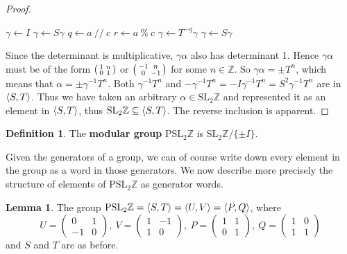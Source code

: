 \documentclass[12pt,twoside]{reedthesis}
\theoremstyle{definition}
\newtheorem{lemma}[thm]{Lemma}
\newtheorem{defn}[thm]{Definition}
\newcommand{\Z}{\mathbb{Z}}
\newcommand{\SLZ}{\mathrm{SL}_2{\Z}}
\newcommand{\PSLZ}{\mathrm{PSL}_2{\Z}}
\newcommand{\defnphrase}[1]{\textbf{#1}}
\DeclarePairedDelimiter\ang{\langle}{\rangle}
\begin{document}
\begin{proof}
  \vspace{1em}
  \begin{algorithmic}
    \State $\gamma \gets I$
      $\gamma \gets S \gamma$
    \EndIf
      \State $q \gets a \ // \ c$
      \State $r \gets a\ \% \ c$
      \State $\gamma \gets T^{-q} \gamma$
        $\gamma \gets S \gamma$
      \EndIf
    \EndWhile
  \end{algorithmic}

  Since the determinant is multiplicative, $\gamma \alpha$ also has determinant 1.
  Hence $\gamma\alpha$ must be of the form $\begin{psmallmatrix}1 & n \\ 0 & 1\end{psmallmatrix}$ or $\begin{psmallmatrix}-1 & n \\ 0 & -1\end{psmallmatrix}$ for some $n \in \Z$.
  So $\gamma \alpha = \pm T^n$, which means that $\alpha = \pm \gamma^{-1} T^n$.
  Both $\gamma^{-1} T^n$ and $-\gamma^{-1} T^n = -I \gamma^{-1} T^n = S^2 \gamma^{-1} T^n$ are in $\ang{S,T}$.
  Thus we have taken an arbitrary $\alpha \in \SLZ$ and represented it as an element in $\ang{S,T}$, thus $\SLZ \subseteq \ang{S,T}$.
  The reverse inclusion is apparent.
\end{proof}

\begin{defn}
  The \defnphrase{modular group} $\PSLZ$ is $\SLZ / \{ \pm I \}$.
\end{defn}

Given the generators of a group, we can of course write down every element in the group as a word in those generators. We now describe more precisely the structure of elements of $\PSLZ$ as generator words.

\begin{lemma}\label{lemma:pslgenerators}
  The group $\PSLZ = \ang{S, T} = \ang{U,V} = \ang{P,Q}$, where
  \begin{equation*}
    U = \begin{pmatrix}
      0 & 1 \\
      -1 & 0
    \end{pmatrix},\
    V = \begin{pmatrix}
      1 & -1 \\
      1 & 0
    \end{pmatrix},\
    P = \begin{pmatrix}
      1 & 1 \\
      0 & 1
    \end{pmatrix},\
    Q = \begin{pmatrix}
      1 & 0 \\
      1 & 1
    \end{pmatrix}
  \end{equation*}
  and $S$ and $T$ are as before.
\end{lemma}
\end{document}
